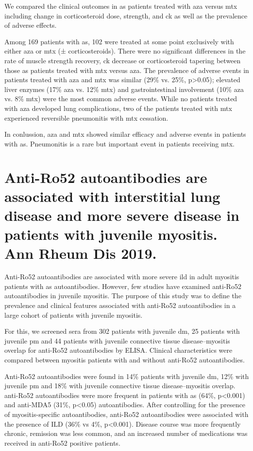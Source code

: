 We compared the clinical outcomes in \gls{as} patients treated with \gls{aza} versus \gls{mtx} including change in corticosteroid dose, strength, and \gls{ck} as well as the prevalence of adverse effects.

Among 169 patients with \gls{as}, 102 were treated at some point exclusively with either \gls{aza} or \gls{mtx} (± corticosteroids). There were no significant differences in the rate of muscle strength recovery, \gls{ck} decrease or corticosteroid tapering between those \gls{as} patients treated with \gls{mtx} versus \gls{aza}. The prevalence of adverse events in patients treated with \gls{aza} and \gls{mtx} was similar (29\% vs. 25\%, p>0.05); elevated liver enzymes (17\% \gls{aza} vs. 12\% \gls{mtx}) and gastrointestinal involvement (10\% \gls{aza} vs. 8\% \gls{mtx}) were the most common adverse events. While no patients treated with \gls{aza} developed lung complications, two of the patients treated with \gls{mtx} experienced reversible pneumonitis with \gls{mtx} cessation. 

In conlussion, \gls{aza} and \gls{mtx} showed similar efficacy and adverse events in patients with \gls{as}. Pneumonitis is a rare but important event in patients receiving \gls{mtx}.



\section{Anti-Ro52 autoantibodies are associated with interstitial lung disease and more severe disease in patients with juvenile myositis. Ann Rheum Dis 2019.}
\label{sec:ro52}
Anti-Ro52 autoantibodies are associated with more severe \gls{ild} in adult myositis patients with \gls{as} autoantibodies. However, few studies have examined anti-Ro52 autoantibodies in juvenile myositis. The purpose of this study was to define the prevalence and clinical features associated with anti-Ro52 autoantibodies in a large cohort of patients with juvenile myositis.

For this, we screened sera from 302 patients with juvenile \gls{dm}, 25 patients with juvenile \gls{pm} and 44 patients with
juvenile connective tissue disease–myositis overlap for anti-Ro52 autoantibodies by ELISA. Clinical characteristics were compared between myositis patients with and without anti-Ro52 autoantibodies.

Anti-Ro52 autoantibodies were found in 14\% patients with juvenile \gls{dm}, 12\% with juvenile \gls{pm} and 18\% with juvenile connective tissue disease–myositis overlap. anti-Ro52 autoantibodies were more frequent in patients with \gls{as} (64\%, p<0.001) and anti-MDA5 (31\%, p<0.05) autoantibodies. After controlling for the presence of myositis-specific autoantibodies, anti-Ro52 autoantibodies were associated with the presence of ILD (36\% vs 4\%, p<0.001). Disease course was more frequently chronic, remission was less common, and an increased number of medications was received in anti-Ro52 positive patients.

